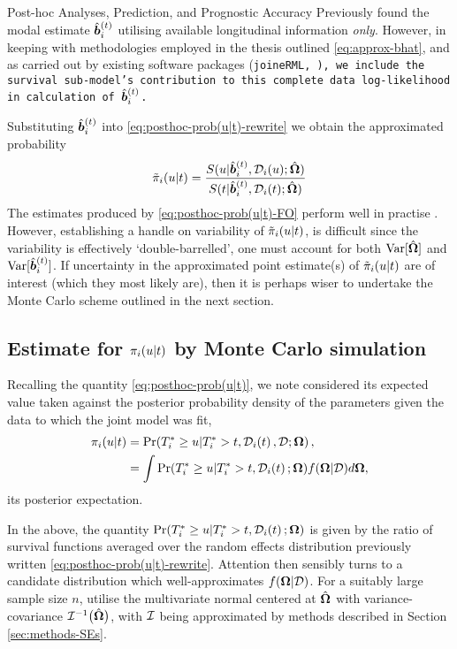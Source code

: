 \begin{chapter}{\label{cha:posthoc}Post-hoc Analyses, Prediction, and Prognostic Accuracy}
Previously \citet{Rizopoulos2011} found the modal estimate $\hat{\bm{b}}_i^{(t)}$ utilising available longitudinal information \textit{only}. However, in keeping with methodologies employed in the thesis outlined \eqref{eq:approx-bhat}, and as carried out by existing software packages (\tt{joineRML}, \citet{Hickey2018}), we include the survival sub-model's contribution to this complete data log-likelihood in calculation of $\hat{\bm{b}}_i^{(t)}$.

Substituting $\hat{\bm{b}}_i^{(t)}$ into \eqref{eq:posthoc-prob(u|t)-rewrite} we obtain the approximated probability
\begin{align}
    \tilde{\pi}_i\!\left( u|t\right)=\frac{S(u|\hat{\bm{b}}_i^{(t)},\mathcal{D}_i(u);\hat{\bm{\Omega}})}{S(t|\hat{\bm{b}}_i^{(t)},\mathcal{D}_i(t);\hat{\bm{\Omega}})}
\label{eq:posthoc-prob(u|t)-FO}
\end{align}
The estimates produced by \eqref{eq:posthoc-prob(u|t)-FO} perform well in practise \citep{Rizopoulos2011}. However, establishing a handle on variability of $\tilde{\pi}_i\!\left( u|t\right)$, is difficult since the variability is effectively `double-barrelled', \ie one must account for both $\mathrm{Var}[\hat{\bm{\Omega}}]$ and $\mathrm{Var}[\hat{\bm{b}}_i^{(t)}]$. If uncertainty in the approximated point estimate(s) of $\tilde{\pi}_i\!\left( u|t\right)$ are of interest (which they most likely are), then it is perhaps wiser to undertake the Monte Carlo scheme outlined in the next section.

\subsection{Estimate for \texorpdfstring{$\pi_i\!\left( u |t\right)$}{piut} by Monte Carlo simulation}\label{sec:posthoc-dynpreds-estimation-MC}
Recalling the quantity \eqref{eq:posthoc-prob(u|t)}, we note \citet{Rizopoulos2011} considered its expected value taken against the posterior probability density of the parameters given the data to which the joint model was fit,
\begin{align}
    \nonumber \pi_i\!\left( u|t\right) &= \Pr\!\left( T_i^*\ge u|T_i^*>t,\mathcal{D}_i\!\left( t\right),\mathcal{D}; \bm{\mathrm{\Omega}}\right),\\
    &=\int\Pr(T_i^*\ge u|T_i^*>t,\mathcal{D}_i\!\left( t\right);\bm{\mathrm{\Omega}})f(\bm{\mathrm{\Omega}}|\mathcal{D})d\bm{\mathrm{\Omega}},
\label{eq:posthoc-prob(u|t)-posteriorExp}
\end{align}
\ie its posterior expectation.

In the above, the quantity $\Pr(T_i^*\ge u|T_i^*>t,\mathcal{D}_i\!\left( t\right);\bm{\mathrm{\Omega}})$ is given by the ratio of survival functions averaged over the random effects distribution previously written \eqref{eq:posthoc-prob(u|t)-rewrite}. Attention then sensibly turns to a candidate distribution which well-approximates $f(\bm{\mathrm{\Omega}}|\mathcal{D})$. For a suitably large sample size $n$, \citet{Rizopoulos2011} utilise the multivariate normal centered at $\hat{\bm{\Omega}}$ with variance-covariance $\mathcal{I}^{-1}\big(\hat{\bm{\Omega}}\big)$, with $\cal I$ being approximated by methods described in Section \ref{sec:methods-SEs}. 


\end{chapter}
